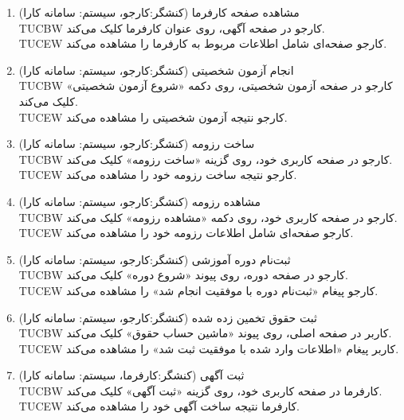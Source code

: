 \documentclass[12pt]{article}
\begin{document}
\begin{enumerate}
		\item
		مشاهده صفحه کارفرما (کنشگر:‌کارجو، سیستم: سامانه کارا)\\
		TUCBW کارجو در صفحه آگهی، روی عنوان کارفرما کلیک می‌کند.\\
		TUCEW کارجو صفحه‌ای شامل اطلاعات مربوط به کارفرما را مشاهده می‌کند.\\

		\item
		انجام آزمون‌ شخصیتی (کنشگر:‌کارجو، سیستم: سامانه کارا)\\
		TUCBW کارجو در صفحه آزمون شخصیتی، روی دکمه «شروع آزمون شخصیتی» کلیک می‌کند.\\
		TUCEW کارجو نتیجه‌ آزمون شخصیتی را مشاهده می‌کند.\\

		\item
		ساخت رزومه (کنشگر:‌کارجو، سیستم: سامانه کارا)\faStar\\
		TUCBW کارجو در صفحه کاربری خود، روی گزینه «ساخت رزومه» کلیک می‌کند.\\
		TUCEW کارجو نتیجه ساخت رزومه خود را مشاهده می‌کند.\\

		\item
		مشاهده رزومه (کنشگر:‌کارجو، سیستم: سامانه کارا)\\
		TUCBW کارجو در صفحه کاربری خود، روی دکمه «مشاهده رزومه» کلیک می‌کند.\\
		TUCEW کارجو صفحه‌ای شامل اطلاعات رزومه خود را مشاهده می‌کند.\\

		\item
		ثبت‌نام دوره‌ آموزشی (کنشگر:‌کارجو، سیستم: سامانه کارا)\\
		TUCBW کارجو در صفحه دوره، روی پیوند «شروع دوره» کلیک می‌کند.\\
		TUCEW کارجو پیغام «ثبت‌نام دوره با موفقیت انجام شد» را مشاهده می‌کند.\\

		\item
		ثبت حقوق تخمین زده شده (کنشگر:‌کارجو، سیستم: سامانه کارا)\\
		TUCBW کاربر در صفحه اصلی، روی پیوند «ماشین حساب حقوق» کلیک می‌کند.\\
		TUCEW کاربر پیغام «اطلاعات وارد شده با موفقیت ثبت شد» را مشاهده می‌کند.\\

		\item
		ثبت آگهی (کنشگر:‌کارفرما، سیستم: سامانه کارا)\faStar\\
		TUCBW کارفرما در صفحه کاربری خود، روی گزینه «ثبت آگهی» کلیک می‌کند.\\
		TUCEW کارفرما نتیجه ساخت آگهی خود را مشاهده می‌کند.\\


\end{enumerate}
\end{document}
